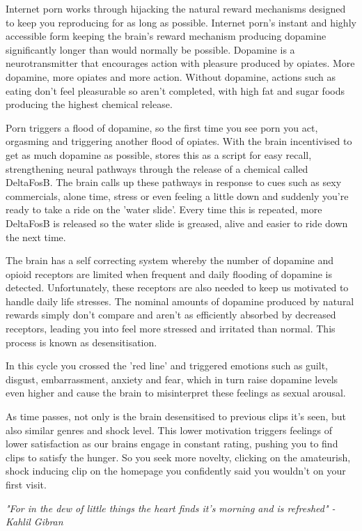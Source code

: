 \documentclass[easypeasy.tex]{subfiles}
\begin{document}
Internet porn works through hijacking the natural reward mechanisms designed to keep you reproducing for as long as possible. Internet porn's instant and highly accessible form keeping the brain's reward mechanism producing dopamine significantly longer than would normally be possible. Dopamine is a neurotransmitter that encourages action with pleasure produced by opiates. More dopamine, more opiates and more action. Without dopamine, actions such as eating don't feel pleasurable so aren't completed, with high fat and sugar foods producing the highest chemical release.

Porn triggers a flood of dopamine, so the first time you see porn you act, orgasming and triggering another flood of opiates. With the brain incentivised to get as much dopamine as possible, stores this as a script for easy recall, strengthening neural pathways through the release of a chemical called DeltaFosB. The brain calls up these pathways in response to cues such as sexy commercials, alone time, stress or even feeling a little down and suddenly you're ready to take a ride on the 'water slide'. Every time this is repeated, more DeltaFosB is released so the water slide is greased, alive and easier to ride down the next time.

The brain has a self correcting system whereby the number of dopamine and opioid receptors are limited when frequent and daily flooding of dopamine is detected. Unfortunately, these receptors are also needed to keep us motivated to handle daily life stresses. The nominal amounts of dopamine produced by natural rewards simply don't compare and aren't as efficiently absorbed by decreased receptors, leading you into feel more stressed and irritated than normal. This process is known as desensitisation.

In this cycle you crossed the 'red line' and triggered emotions such as guilt, disgust, embarrassment, anxiety and fear, which in turn raise dopamine levels even higher and cause the brain to misinterpret these feelings as sexual arousal.

As time passes, not only is the brain desensitised to previous clips it's seen, but also similar genres and shock level. This lower motivation triggers feelings of lower satisfaction as our brains engage in constant rating, pushing you to find clips to satisfy the hunger. So you seek more novelty, clicking on the amateurish, shock inducing clip on the homepage you confidently said you wouldn't on your first visit.

\textit{"For in the dew of little things the heart finds it's morning and is refreshed" - Kahlil Gibran}
\end{document}
